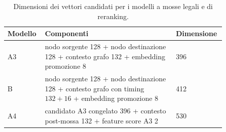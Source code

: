 \begin{table}[H]
\centering
\small
\caption{Dimensioni dei vettori candidati per i modelli a mosse legali e di reranking.}
\label{tab:candidate-dimensions}
\begin{tabular}{p{0.14\linewidth}p{0.58\linewidth}p{0.14\linewidth}}
\toprule
Modello & Componenti & Dimensione \\
\midrule
A3 & nodo sorgente 128 + nodo destinazione 128 + contesto grafo 132 + embedding promozione 8 & 396 \\
B & nodo sorgente 128 + nodo destinazione 128 + contesto grafo con timing \(132+16\) + embedding promozione 8 & 412 \\
A4 & candidato A3 congelato 396 + contesto post-mossa 132 + feature score A3 2 & 530 \\
\bottomrule
\end{tabular}
\end{table}
